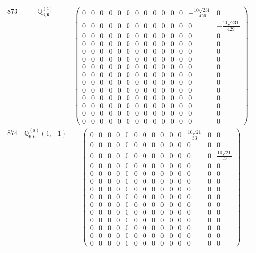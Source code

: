 \documentclass[fleqn,8pt,landscape]{jsarticle}
\begin{document}
\begin{center}
\begin{longtable}{ccc}
$ 873 $ & $ \mathbb{Q}_{6,6}^{(a)} $ & $ \begin{pmatrix} 0 & 0 & 0 & 0 & 0 & 0 & 0 & 0 & 0 & 0 & 0 & 0 & - \frac{10 \sqrt{231}}{429} & 0 \\ 0 & 0 & 0 & 0 & 0 & 0 & 0 & 0 & 0 & 0 & 0 & 0 & 0 & - \frac{10 \sqrt{231}}{429} \\ 0 & 0 & 0 & 0 & 0 & 0 & 0 & 0 & 0 & 0 & 0 & 0 & 0 & 0 \\ 0 & 0 & 0 & 0 & 0 & 0 & 0 & 0 & 0 & 0 & 0 & 0 & 0 & 0 \\ 0 & 0 & 0 & 0 & 0 & 0 & 0 & 0 & 0 & 0 & 0 & 0 & 0 & 0 \\ 0 & 0 & 0 & 0 & 0 & 0 & 0 & 0 & 0 & 0 & 0 & 0 & 0 & 0 \\ 0 & 0 & 0 & 0 & 0 & 0 & 0 & 0 & 0 & 0 & 0 & 0 & 0 & 0 \\ 0 & 0 & 0 & 0 & 0 & 0 & 0 & 0 & 0 & 0 & 0 & 0 & 0 & 0 \\ 0 & 0 & 0 & 0 & 0 & 0 & 0 & 0 & 0 & 0 & 0 & 0 & 0 & 0 \\ 0 & 0 & 0 & 0 & 0 & 0 & 0 & 0 & 0 & 0 & 0 & 0 & 0 & 0 \\ 0 & 0 & 0 & 0 & 0 & 0 & 0 & 0 & 0 & 0 & 0 & 0 & 0 & 0 \\ 0 & 0 & 0 & 0 & 0 & 0 & 0 & 0 & 0 & 0 & 0 & 0 & 0 & 0 \\ 0 & 0 & 0 & 0 & 0 & 0 & 0 & 0 & 0 & 0 & 0 & 0 & 0 & 0 \\ 0 & 0 & 0 & 0 & 0 & 0 & 0 & 0 & 0 & 0 & 0 & 0 & 0 & 0 \end{pmatrix} $ \\ \hline
$ 874 $ & $ \mathbb{Q}_{6,6}^{(a)}(1,-1) $ & $ \begin{pmatrix} 0 & 0 & 0 & 0 & 0 & 0 & 0 & 0 & 0 & 0 & 0 & \frac{10 \sqrt{21}}{33} & 0 & 0 \\ 0 & 0 & 0 & 0 & 0 & 0 & 0 & 0 & 0 & 0 & 0 & 0 & 0 & 0 \\ 0 & 0 & 0 & 0 & 0 & 0 & 0 & 0 & 0 & 0 & 0 & 0 & 0 & \frac{10 \sqrt{21}}{33} \\ 0 & 0 & 0 & 0 & 0 & 0 & 0 & 0 & 0 & 0 & 0 & 0 & 0 & 0 \\ 0 & 0 & 0 & 0 & 0 & 0 & 0 & 0 & 0 & 0 & 0 & 0 & 0 & 0 \\ 0 & 0 & 0 & 0 & 0 & 0 & 0 & 0 & 0 & 0 & 0 & 0 & 0 & 0 \\ 0 & 0 & 0 & 0 & 0 & 0 & 0 & 0 & 0 & 0 & 0 & 0 & 0 & 0 \\ 0 & 0 & 0 & 0 & 0 & 0 & 0 & 0 & 0 & 0 & 0 & 0 & 0 & 0 \\ 0 & 0 & 0 & 0 & 0 & 0 & 0 & 0 & 0 & 0 & 0 & 0 & 0 & 0 \\ 0 & 0 & 0 & 0 & 0 & 0 & 0 & 0 & 0 & 0 & 0 & 0 & 0 & 0 \\ 0 & 0 & 0 & 0 & 0 & 0 & 0 & 0 & 0 & 0 & 0 & 0 & 0 & 0 \\ 0 & 0 & 0 & 0 & 0 & 0 & 0 & 0 & 0 & 0 & 0 & 0 & 0 & 0 \\ 0 & 0 & 0 & 0 & 0 & 0 & 0 & 0 & 0 & 0 & 0 & 0 & 0 & 0 \\ 0 & 0 & 0 & 0 & 0 & 0 & 0 & 0 & 0 & 0 & 0 & 0 & 0 & 0 \end{pmatrix} $ \\ \hline

\end{longtable}
\end{center}
\end{document}
